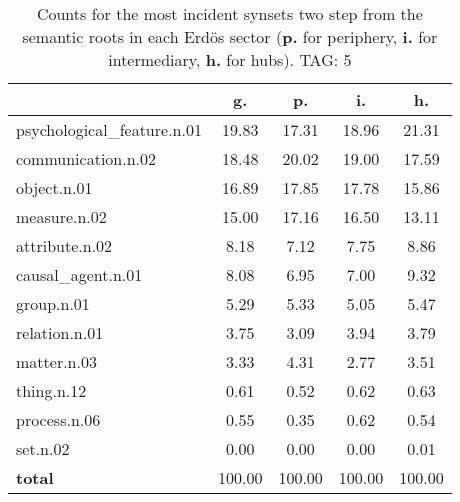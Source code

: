 \begin{table}[h!]
\begin{center}
\begin{tabular}{| l | c | c | c | c |}\hline
 & g. & p. & i. & h. \\\hline
psychological\_feature.n.01 & 19.83  & 17.31  & 18.96  & 21.31 \\\hline
communication.n.02 & 18.48  & 20.02  & 19.00  & 17.59 \\\hline
object.n.01 & 16.89  & 17.85  & 17.78  & 15.86 \\\hline
measure.n.02 & 15.00  & 17.16  & 16.50  & 13.11 \\\hline
attribute.n.02 & 8.18  & 7.12  & 7.75  & 8.86 \\\hline
causal\_agent.n.01 & 8.08  & 6.95  & 7.00  & 9.32 \\\hline
group.n.01 & 5.29  & 5.33  & 5.05  & 5.47 \\\hline
relation.n.01 & 3.75  & 3.09  & 3.94  & 3.79 \\\hline
matter.n.03 & 3.33  & 4.31  & 2.77  & 3.51 \\\hline
thing.n.12 & 0.61  & 0.52  & 0.62  & 0.63 \\\hline
process.n.06 & 0.55  & 0.35  & 0.62  & 0.54 \\\hline
set.n.02 & 0.00  & 0.00  & 0.00  & 0.01 \\\hline
{{\bf total}} & 100.00  & 100.00  & 100.00  & 100.00 \\\hline
\end{tabular}
\caption{Counts for the most incident synsets two step from the semantic roots in each Erd\"os sector ({\bf p.} for periphery, {\bf i.} for intermediary, {\bf h.} for hubs). TAG: 5}
\end{center}
\end{table}